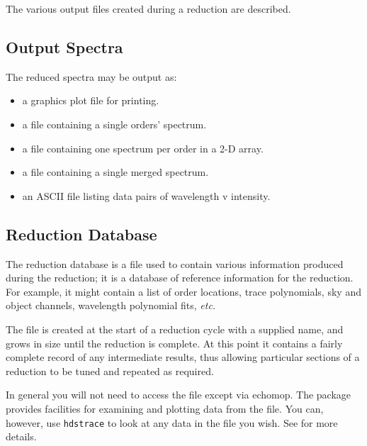 The various output files created during a reduction are described.

\subsection{Output Spectra}

The reduced spectra may be output as:

\begin{itemize}

\item a graphics plot file for printing.

\item a file containing a single orders' spectrum.

\item a file containing one spectrum per order in a 2-D array.

\item a file containing a single merged spectrum.

\item an ASCII file listing data pairs of wavelength v intensity.


\end{itemize}

\subsection{Reduction Database}

The reduction database is a file used to contain
various information produced during the reduction; it is a database of
reference information for the reduction.
For example, it might contain a list of order locations,
trace polynomials, sky and object channels, wavelength polynomial fits,
{\it etc.}

The file is created at the start of a reduction cycle with a supplied name,
and grows in size until the reduction is complete.
At this point it contains a fairly complete record of any intermediate
results, thus allowing particular sections of a reduction to be tuned
and repeated as required.

In general you will not need to access the file except via {\sc echomop}.
The package provides facilities for examining and plotting data from the file.
You can, however, use \verb+hdstrace+ to look at any data in the file you wish.
See  for more details.


